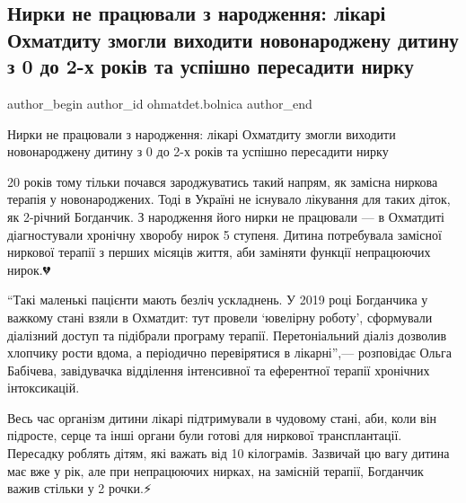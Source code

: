  
 
 
 
 
 
\subsection{Нирки не працювали з народження: лікарі Охматдиту змогли виходити новонароджену дитину з 0 до 2-х років та успішно пересадити нирку}
\label{sec:29_11_2022.fb.ohmatdet.bolnica.1.nyrky}
 
\ifcmt
 author_begin
   author_id ohmatdet.bolnica
 author_end
\fi

Нирки не працювали з народження: лікарі Охматдиту змогли виходити новонароджену
дитину з 0 до 2-х років та успішно пересадити нирку🙏🏻

20 років тому тільки почався зароджуватись такий напрям, як замісна ниркова
терапія у новонароджених. Тоді в Україні не існувало лікування для таких діток,
як 2-річний Богданчик. З народження його нирки не працювали — в Охматдиті
діагностували хронічну хворобу нирок 5 ступеня. Дитина потребувала замісної
ниркової терапії з перших місяців життя, аби заміняти функції непрацюючих
нирок.💔

\enquote{Такі маленькі пацієнти мають безліч ускладнень. У 2019 році Богданчика у
важкому стані взяли в Охматдит: тут провели \enquote{ювелірну роботу}, сформували
діалізний доступ та підібрали програму терапії. Перетоніальний діаліз дозволив
хлопчику рости вдома, а періодично перевірятися в лікарні},— розповідає Ольга
Бабічева, завідувачка відділення інтенсивної та еферентної терапії хронічних
інтоксикацій.💪🏻

Весь час організм дитини лікарі підтримували в чудовому стані, аби, коли він
підросте, серце та інші органи були готові для ниркової трансплантації.
Пересадку роблять дітям, які важать від 10 кілограмів. Зазвичай цю вагу дитина
має вже у рік, але при непрацюючих нирках, на замісній терапії, Богданчик важив
стільки у 2 рочки.⚡️

